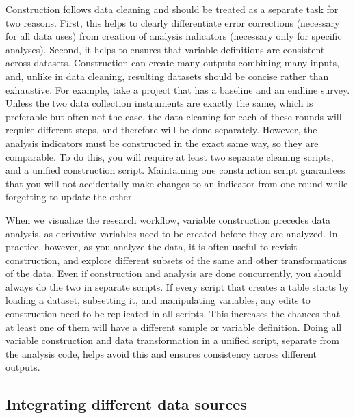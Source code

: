 Construction follows data cleaning and 
should be treated as a separate task for two reasons.
First, this helps to clearly differentiate error corrections 
(necessary for all data uses)
from creation of analysis indicators 
(necessary only for specific analyses).
Second, it helps to ensures that variable definitions are
consistent across datasets.
Construction can create many outputs combining many inputs,
and, unlike in data cleaning,
resulting datasets should be concise rather than exhaustive.
For example, take a project that has a baseline and an endline survey.
Unless the two data collection instruments are exactly the same,
which is preferable but often not the case,
the data cleaning for each of these rounds will require different steps,
and therefore will be done separately.
However, the analysis indicators must be constructed in the exact same way,
so they are comparable.
To do this, you will require at least two separate cleaning scripts,
and a unified construction script.
Maintaining one construction script guarantees that you will not
accidentally make changes to an indicator from one round
while forgetting to update the other.

When we visualize the research workflow,
variable construction precedes data analysis,
as derivative variables need to be created before they are analyzed.
In practice, however, as you analyze the data,
it is often useful to revisit construction,
and explore different subsets of the same and other transformations of the data.
Even if construction and analysis are done concurrently,
you should always do the two in separate scripts.
If every script that creates a table starts by loading a dataset,
subsetting it, and manipulating variables,
any edits to construction need to be replicated in all scripts.
This increases the chances that at least one of them
will have a different sample or variable definition.
Doing all variable construction and data transformation
in a unified script, separate from the analysis code, helps
avoid this and ensures consistency across different outputs.

\subsection{Integrating different data sources}

